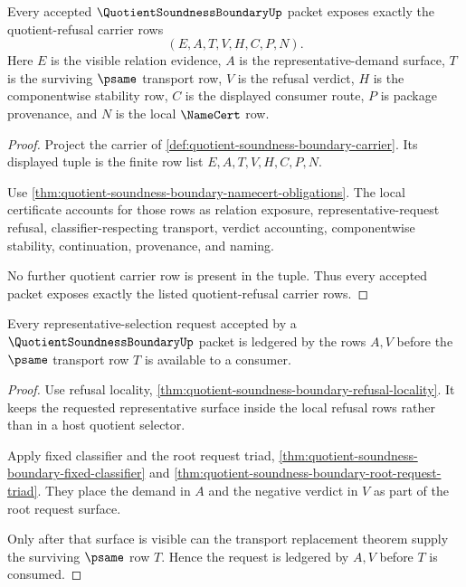 \begin{theorem}
\label{thm:quotient-soundness-boundary-carrier-exposure}
Every accepted $\QuotientSoundnessBoundaryUp$ packet exposes exactly the quotient-refusal carrier rows
$$
(E,A,T,V,H,C,P,N).
$$
Here $E$ is the visible relation evidence, $A$ is the representative-demand surface, $T$ is the surviving $\psame$ transport row, $V$ is the refusal verdict, $H$ is the componentwise stability row, $C$ is the displayed consumer route, $P$ is package provenance, and $N$ is the local $\NameCert$ row.
\end{theorem}
\begin{proof}
Project the carrier of \autoref{def:quotient-soundness-boundary-carrier}. Its displayed tuple is the finite row list $E,A,T,V,H,C,P,N$.

Use \autoref{thm:quotient-soundness-boundary-namecert-obligations}. The local certificate accounts for those rows as relation exposure, representative-request refusal, classifier-respecting transport, verdict accounting, componentwise stability, continuation, provenance, and naming.

No further quotient carrier row is present in the tuple. Thus every accepted packet exposes exactly the listed quotient-refusal carrier rows.
\end{proof}

\begin{theorem}
\label{thm:quotient-soundness-boundary-refusal-ledger}
Every representative-selection request accepted by a $\QuotientSoundnessBoundaryUp$ packet is ledgered by the rows $A,V$ before the $\psame$ transport row $T$ is available to a consumer.
\end{theorem}
\begin{proof}
Use refusal locality, \autoref{thm:quotient-soundness-boundary-refusal-locality}. It keeps the requested representative surface inside the local refusal rows rather than in a host quotient selector.

Apply fixed classifier and the root request triad, \autoref{thm:quotient-soundness-boundary-fixed-classifier} and \autoref{thm:quotient-soundness-boundary-root-request-triad}. They place the demand in $A$ and the negative verdict in $V$ as part of the root request surface.

Only after that surface is visible can the transport replacement theorem supply the surviving $\psame$ row $T$. Hence the request is ledgered by $A,V$ before $T$ is consumed.
\end{proof}

